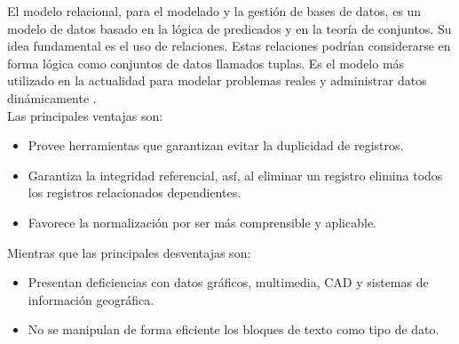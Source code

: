 \documentclass[12pt, a4paper, titlepage]{report}
\begin{document}
            El modelo relacional, para el modelado y la gestión de bases de datos, es un modelo de datos basado en la lógica de predicados y en la teoría de conjuntos.
            Su idea fundamental es el uso de relaciones. Estas relaciones podrían considerarse en forma lógica como conjuntos de datos llamados tuplas. Es el modelo más utilizado en la actualidad para modelar problemas reales y administrar datos dinámicamente \cite{refER}.\\
            
            Las principales ventajas son: 
            \begin{itemize}
                \item Provee herramientas que garantizan evitar la duplicidad de registros.
                \item Garantiza la integridad referencial, así, al eliminar un registro elimina todos los registros relacionados dependientes.
                \item Favorece la normalización por ser más comprensible y aplicable.
            \end{itemize}

            Mientras que las principales desventajas son: 
            \begin{itemize}
                \item Presentan deficiencias con datos gráficos, multimedia, CAD y sistemas de información geográfica.
                \item No se manipulan de forma eficiente los bloques de texto como tipo de dato.
            \end{itemize}
			
			\paragraph{}
			
			
			
\end{document}
